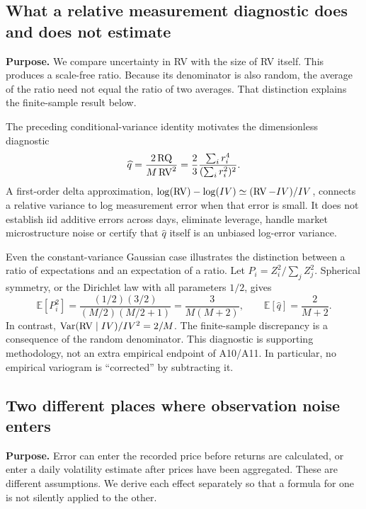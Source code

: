 \subsection{What a relative measurement diagnostic does and does not estimate}\label{app:qhat}
\textbf{Purpose.} We compare uncertainty in RV with the size of RV itself. This produces a scale-free ratio. Because its denominator is also random, the average of the ratio need not equal the ratio of two averages. That distinction explains the finite-sample result below.

The preceding conditional-variance identity motivates the dimensionless diagnostic
\begin{equation}
 \widehat q=\frac{2\operatorname{RQ}}{M\operatorname{RV}^2}
 =\frac{2}{3}\frac{\sum_i r_i^4}{(\sum_i r_i^2)^2}.
\end{equation}
A first-order delta approximation, $\log(\operatorname{RV})-\log(IV)\simeq(\operatorname{RV}-IV)/IV$, connects a relative variance to log measurement error when that error is small. It does not establish iid additive errors across days, eliminate leverage, handle market microstructure noise or certify that $\widehat q$ itself is an unbiased log-error variance.

Even the constant-variance Gaussian case illustrates the distinction between a ratio of expectations and an expectation of a ratio. Let $P_i=Z_i^2/\sum_j Z_j^2$. Spherical symmetry, or the Dirichlet law with all parameters $1/2$, gives
\begin{equation}
 \mathbb E[P_i^2]=\frac{(1/2)(3/2)}{(M/2)(M/2+1)}
 =\frac{3}{M(M+2)},\qquad
 \mathbb E[\widehat q]=\frac{2}{M+2}.
\end{equation}
In contrast, $\operatorname{Var}(\operatorname{RV}\mid IV)/IV^2=2/M$. The finite-sample discrepancy is a consequence of the random denominator. This diagnostic is supporting methodology, not an extra empirical endpoint of A10/A11. In particular, no empirical variogram is ``corrected'' by subtracting it.

\subsection{Two different places where observation noise enters}\label{app:noise}
\textbf{Purpose.} Error can enter the recorded price before returns are calculated, or enter a daily volatility estimate after prices have been aggregated. These are different assumptions. We derive each effect separately so that a formula for one is not silently applied to the other.

